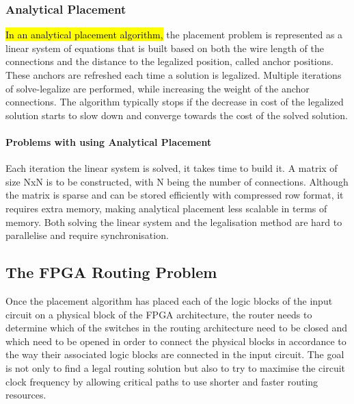 \documentclass[a4paper,oneside,12pt]{article}
\begin{document}
\subsubsection{Analytical Placement}
\hl{In an analytical placement algorithm,} the placement problem is represented as a linear system of equations that is built based on both the wire length of the connections and the distance to the legalized position, called anchor positions. These anchors are refreshed each time a solution is legalized.
Multiple iterations of solve-legalize are performed, while increasing the weight of the anchor connections. The algorithm typically stops if the decrease in cost of the legalized solution starts to slow down and converge towards the cost of the solved solution.  %

\paragraph{Problems with using Analytical Placement}
Each iteration the linear system is solved, it takes time to build it. A matrix of size NxN is to be constructed, with N being the number of connections. Although the matrix is sparse and can be stored efficiently with compressed row format, it requires extra memory, making analytical placement less scalable in terms of memory.
Both solving the linear system and the legalisation method are hard to parallelise and require synchronisation.

\subsection{The FPGA Routing Problem}
Once the placement algorithm has placed each of the logic blocks of the input circuit on a physical block of the FPGA architecture, the router needs to determine which of the switches in the routing architecture need to be closed and which need to be opened in order to connect the physical blocks in accordance to the way their associated logic blocks are connected in the input circuit. The goal is not only to find a legal routing solution but also to try to maximise the circuit clock frequency by allowing critical paths to use shorter and faster routing resources.
\end{document}
